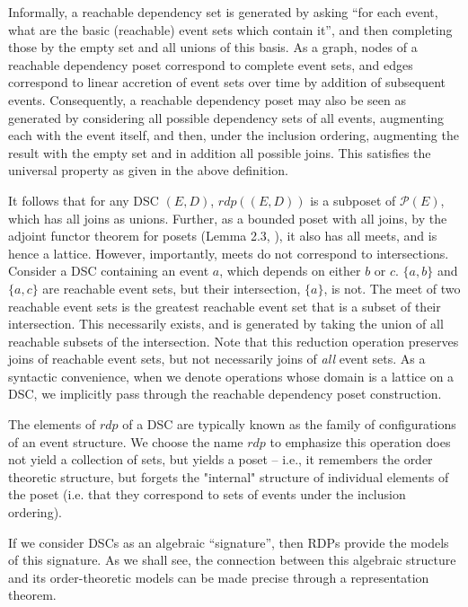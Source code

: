 \documentclass[a4paper,USenglish,cleveref, autoref, thm-restate,authorcolumns]{lipics-v2019}
\newcommand{\Pc}{\mathcal{P}}
\begin{document}
Informally, a reachable dependency set is generated by asking ``for each event, what are the basic (reachable) event sets which contain it'', and then completing those by the empty set and all unions of this basis.  As a graph, nodes of a reachable dependency poset correspond to complete event sets, and edges correspond to linear accretion of event sets over time by addition of subsequent events. Consequently, a reachable dependency poset may also be seen as generated by considering all possible dependency sets of all events, augmenting each with the event itself, and then, under the inclusion ordering, augmenting the result with the empty set and in addition all possible joins. This satisfies the universal property as given in the above definition.

It follows that for any DSC \((E,D)\), \(rdp((E,D))\)  is a subposet of \(\Pc(E)\), which has all joins as unions. Further, as a bounded poset with all joins, by the adjoint functor theorem for posets (Lemma 2.3, \cite{davey2002introduction}), it also has all  meets, and is hence a lattice. However, importantly, meets do not correspond to intersections. Consider a DSC containing an event \(a\), which depends on either \(b\) or \(c\). \(\{a,b\}\) and  \(\{a,c\}\) are reachable event sets, but their intersection, \(\{a\}\), is not. The meet of two reachable event sets is the greatest reachable event set that is a subset of their intersection. This necessarily exists, and is generated by taking the union of all reachable subsets of the intersection. Note that this reduction operation preserves joins of reachable event sets, but not necessarily joins of \textit{all} event sets. As a syntactic convenience, when we denote operations whose domain is a lattice on a DSC, we implicitly pass through the reachable dependency poset construction.

The elements of \(rdp\) of a DSC are typically known as the family of configurations of an event structure. We choose the name \(rdp\) to emphasize this operation does not yield a collection of sets, but yields a poset -- i.e., it remembers the order theoretic structure, but forgets the "internal" structure of individual elements of the poset (i.e. that they correspond to sets of events under the inclusion ordering).

If we consider DSCs as an algebraic ``signature'', then RDPs provide the models of this signature. As we shall see, the connection between this algebraic structure and its order-theoretic models can be made precise through a representation theorem.
\end{document}
